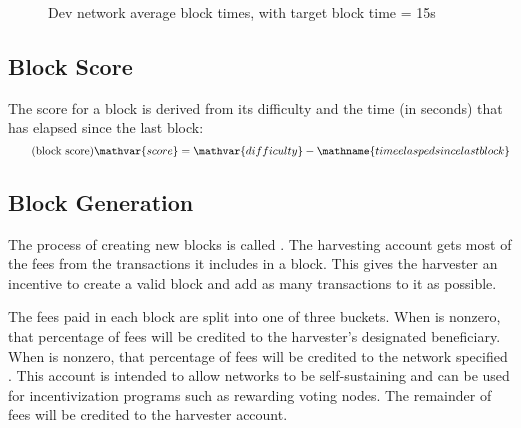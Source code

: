 \begin{figure}
	\caption{Dev network average block times, with target block time = 15s}
\end{figure}

\subsection{Block Score}
\label{sec:blockchain:blockScore}
\label{sec:blockchain:score}

The score for a block is derived from its difficulty and the time (in seconds) that has elapsed since the last block:
\begin{equation}
	\tag{block score} \mathvar{score} = \mathvar{difficulty} - \mathname{time elasped since last block}
\end{equation}

\subsection{Block Generation}
\label{sec:blockchain:generation}

The process of creating new blocks is called .
The harvesting account gets most of the fees from the transactions it includes in a block.
This gives the harvester an incentive to create a valid block and add as many transactions to it as possible.

The fees paid in each block are split into one of three buckets.
When  is nonzero, that percentage of fees will be credited to the harvester's designated beneficiary.
When  is nonzero, that percentage of fees will be credited to the network specified .
This account is intended to allow networks to be self-sustaining and can be used for incentivization programs such as rewarding voting nodes.
The remainder of fees will be credited to the harvester account.


